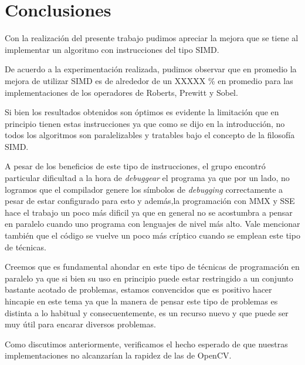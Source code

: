 \section{Conclusiones}

Con la realización del presente trabajo pudimos apreciar la mejora que se tiene al implementar un algoritmo con instrucciones del tipo SIMD.

De acuerdo a la experimentación realizada, pudimos observar que en promedio la mejora de utilizar SIMD es de alrededor de un XXXXX \% en promedio para las implementaciones de los operadores de Roberts, Prewitt y Sobel.

Si bien los resultados obtenidos son óptimos es evidente la limitación que en principio tienen estas instrucciones ya que como se dijo en la introducción, no todos los algoritmos son paralelizables y tratables bajo el concepto de la filosofía SIMD.

A pesar de los beneficios de este tipo de instrucciones, el grupo encontró particular dificultad a la hora de \emph{debuggear} el programa ya que por un lado, no logramos que el compilador genere los símbolos de \emph{debugging} correctamente a pesar de estar configurado para esto y además,la programación con MMX y SSE hace el trabajo un poco más dificil ya que en general no se acostumbra a pensar en paralelo cuando uno programa con lenguajes de nivel más alto. Vale mencionar también que el código se vuelve un poco más críptico cuando se emplean este tipo de técnicas.

Creemos que es fundamental ahondar en este tipo de técnicas de programación en paralelo ya que si bien su uso en principio puede estar restringido a un conjunto bastante acotado de problemas, estamos convencidos que es positivo hacer hincapie en este tema ya que la manera de pensar este tipo de problemas es distinta a lo habitual y consecuentemente, es un recurso nuevo y que puede ser muy útil para encarar diversos problemas.



Como discutimos anteriormente, verificamos el hecho esperado de que nuestras implementaciones no alcanzarían la rapidez de las de OpenCV.

